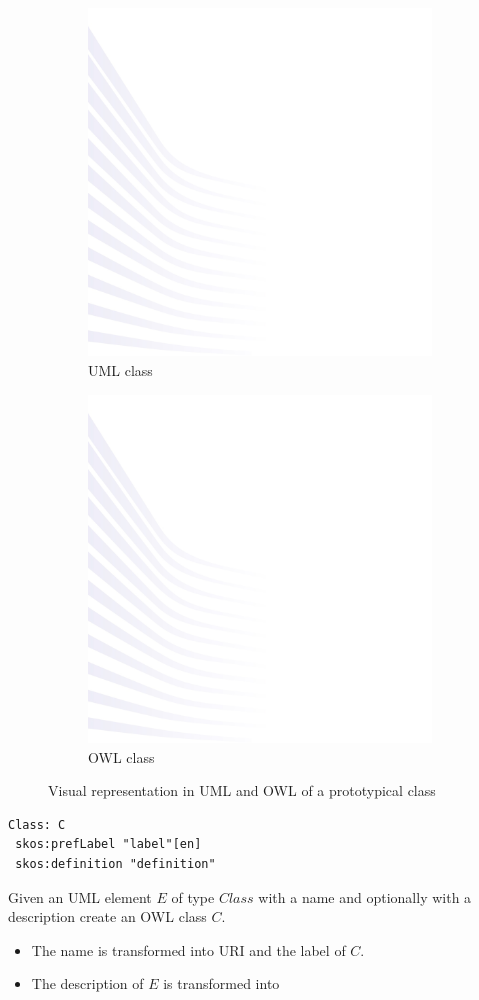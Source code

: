 \begin{figure}[!ht]
	\centering
	\begin{subfigure}{.5\textwidth}
		\centering
		\includegraphics[width=.45\linewidth]{images/background.png}
		\caption{UML class}
		\label{fig:class-uml}
	\end{subfigure}%
	\begin{subfigure}{.5\textwidth}
		\centering
		\includegraphics[width=.45\linewidth]{images/background.png}
		\caption{OWL class}
		\label{fig:class-owl}
	\end{subfigure}
	\caption{Visual representation in UML and OWL of a prototypical class }
	\label{fig:class}
\end{figure}

\begin{lstlisting}[caption={OWL Class},captionpos=b]
Class: C
 skos:prefLabel "label"[en]
 skos:definition "definition"
\end{lstlisting}

\begin{trule}[Class]
	\label{rule:class}
	Given an UML element $E$ of type $Class$ with a name and optionally with a description  create an OWL class $C$. 
	\begin{itemize}
		\item The name is transformed into URI and the label of $C$.
		\item The description of $E$ is transformed into 
	\end{itemize}		 	
\end{trule}

